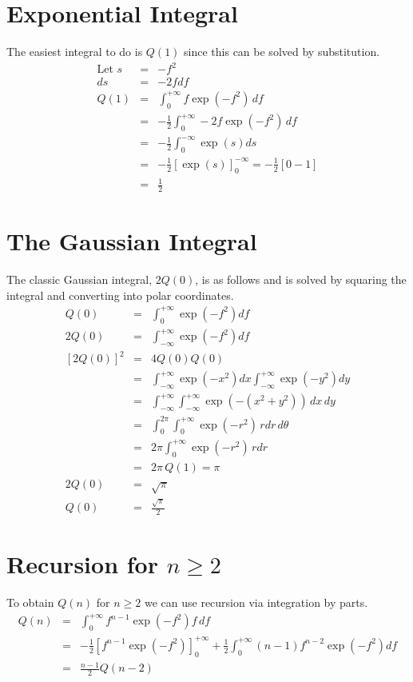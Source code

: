 \documentclass{article}
\begin{document}
\section{Exponential Integral}
The easiest integral to do is $ Q(1) $ since this can be solved by substitution.
\begin{eqnarray}
	\mbox{Let } s & = & -f^2 \\
	ds & = & -2f df \\
	Q(1) & = & \int_0^{+\infty} f \exp(-f^2) \, df \\
	& = & -\frac{1}{2} \int_0^{+\infty} -2f \exp(-f^2) \, df \\
	& = & -\frac{1}{2} \int_0^{-\infty} \exp(s) ds \\
	& = & -\frac{1}{2} \left[ \exp(s) \right]_0^{-\infty} = -\frac{1}{2} \left[ 0 - 1 \right] \\
	& = & \frac{1}{2}
\end{eqnarray}
\section{The Gaussian Integral}

The classic Gaussian integral, $ 2 Q(0) $, is as follows and is solved by squaring the integral and converting into polar coordinates.
\begin{eqnarray}
Q(0) & = & \int_0^{+\infty} \exp(-f^2) df \\
2Q(0) & = & \int_{-\infty}^{+\infty} \exp(-f^2) df \\
\left[  2 Q(0) \right]^2 & = &  4 Q(0) Q(0) \\
                      & = & \int_{-\infty}^{+\infty} \exp(-x^2) dx  \int_{-\infty}^{+\infty} \exp(- y^2) dy \\
          & = & \int_{-\infty}^{+\infty} \int_{-\infty}^{+\infty} \exp(-(x^2+y^2)) \,  dx \, dy \\
          & = & \int_0^{2 \pi} \int_0^{+\infty} \exp(-r^2) \,  rdr \, d\theta \\
          & = & 2 \pi \int_0^{+\infty} \exp(-r^2) \,  rdr \\
          & = & 2 \pi \, Q(1) = \pi \\
  2Q(0)   & = & \sqrt{\pi} \\
   Q(0)   & = & \frac{\sqrt{\pi}}{2}
\end{eqnarray}

\section{Recursion for $ n \ge 2 $}
To obtain $ Q(n) $ for $ n \ge 2 $ we can use recursion via integration by parts.
\begin{eqnarray}
Q(n) & = &  \int_0^{+\infty} f^{n-1} \exp(-f^2) f \, df \quad \\ 
& = & -\frac{1}{2} \left[ f^{n-1} \exp(-f^2) \right]_0^{+\infty} +
      \frac{1}{2} \int_0^{+\infty} (n-1) f^{n-2} \exp(-f^2) df \\
    & = & \frac{n-1}{2} Q(n-2)
\end{eqnarray}
\end{document}
